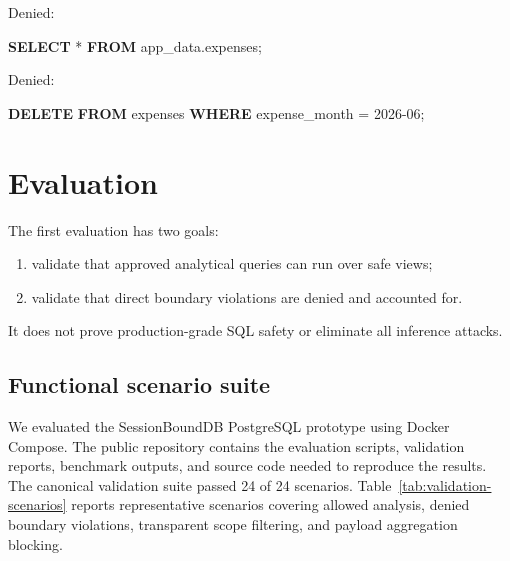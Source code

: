 \documentclass[
]{article}
\newenvironment{Shaded}{}{}
\newcommand{\KeywordTok}[1]{\textcolor[rgb]{0.00,0.44,0.13}{\textbf{#1}}}
\newcommand{\NormalTok}[1]{#1}
\newcommand{\OperatorTok}[1]{\textcolor[rgb]{0.40,0.40,0.40}{#1}}
\newcommand{\StringTok}[1]{\textcolor[rgb]{0.25,0.44,0.63}{#1}}
\providecommand{\tightlist}{%
  \setlength{\itemsep}{0pt}\setlength{\parskip}{0pt}}
\begin{document}
Denied:

\begin{Shaded}
\begin{Highlighting}[]
\KeywordTok{SELECT} \OperatorTok{*} \KeywordTok{FROM}\NormalTok{ app\_data.expenses;}
\end{Highlighting}
\end{Shaded}

Denied:

\begin{Shaded}
\begin{Highlighting}[]
\KeywordTok{DELETE} \KeywordTok{FROM}\NormalTok{ expenses }\KeywordTok{WHERE}\NormalTok{ expense\_month }\OperatorTok{=} \StringTok{\textquotesingle{}2026{-}06\textquotesingle{}}\NormalTok{;}
\end{Highlighting}
\end{Shaded}


\hypertarget{evaluation}{%
\section{Evaluation}\label{evaluation}}

The first evaluation has two goals:

\begin{enumerate}
\def\labelenumi{\arabic{enumi}.}
\tightlist
\item
  validate that approved analytical queries can run over safe views;
\item
  validate that direct boundary violations are denied and accounted for.
\end{enumerate}

It does not prove production-grade SQL safety or eliminate all inference
attacks.

\hypertarget{functional-scenario-suite}{%
\subsection{Functional scenario
suite}\label{functional-scenario-suite}}

We evaluated the SessionBoundDB PostgreSQL prototype using Docker
Compose. The public repository contains the evaluation scripts,
validation reports, benchmark outputs, and source code needed to
reproduce the results. The canonical validation suite passed 24 of 24
scenarios. Table~\ref{tab:validation-scenarios} reports representative
scenarios covering allowed analysis, denied boundary violations,
transparent scope filtering, and payload aggregation blocking.
\end{document}

